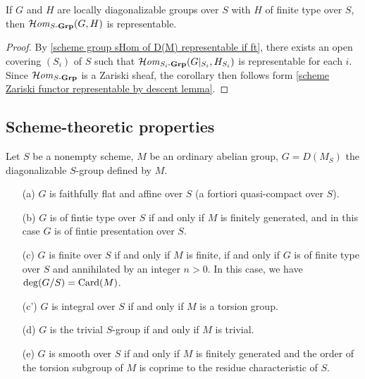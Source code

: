 \begin{corollary}\label{scheme group local diagonalizabl sHom representable}
If $G$ and $H$ are locally diagonalizable groups over $S$ with $H$ of finite type over $S$, then $\operatorname{\mathcal{H}\hspace*{-0.4pt}\textit{om}\hspace{0.5pt}}_{S\textup{-}\mathbf{Grp}}(G,H)$ is representable.
\end{corollary}
\begin{proof}
By \cref{scheme group sHom of D(M) representable if ft}, there exists an open covering $(S_i)$ of $S$ such that $\operatorname{\mathcal{H}\hspace*{-0.4pt}\textit{om}\hspace{0.5pt}}_{S_i\textup{-}\mathbf{Grp}}(G|_{S_i},H_{S_i})$ is representable for each $i$. Since $\operatorname{\mathcal{H}\hspace*{-0.4pt}\textit{om}\hspace{0.5pt}}_{S\textup{-}\mathbf{Grp}}$ is a Zariski sheaf, the corollary then follows form \cref{scheme Zariski functor representable by descent lemma}.
\end{proof}

\subsection{Scheme-theoretic properties}
\begin{proposition}\label{scheme group diagonalizable schematic prop}
Let $S$ be a nonempty scheme, $M$ be an ordinary abelian group, $G=D(M_S)$ the diagonalizable $S$-group defined by $M$.
\begin{enumerate}
    \item[(a)] $G$ is faithfully flat and affine over $S$ (a fortiori quasi-compact over $S$).
    \item[(b)] $G$ is of fintie type over $S$ if and only if $M$ is finitely generated, and in this case $G$ is of fintie presentation over $S$.
    \item[(c)] $G$ is finite over $S$ if and only if $M$ is finite, if and only if $G$ is of finite type over $S$ and annihilated by an integer $n>0$. In this case, we have $\deg(G/S)=\mathrm{Card}(M)$.
    \item[(c')] $G$ is integral over $S$ if and only if $M$ is a torsion group.
    \item[(d)] $G$ is the trivial $S$-group if and only if $M$ is trivial.
    \item[(e)] $G$ is smooth over $S$ if and only if $M$ is finitely generated and the order of the torsion subgroup of $M$ is coprime to the residue characteristic of $S$.
\end{enumerate}
\end{proposition}
